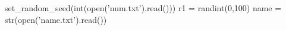 \documentclass{article}
\begin{document}
\begin{sagesilent}
set_random_seed(int(open('num.txt').read()))
r1 = randint(0,100)
name = str(open('name.txt').read())
\end{sagesilent}


\end{document}
